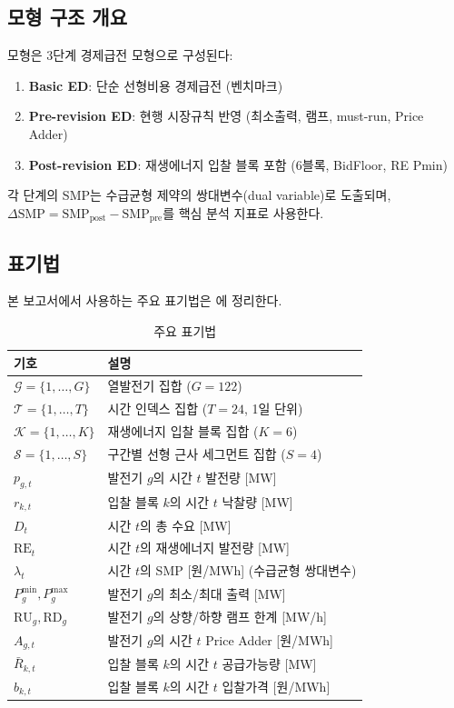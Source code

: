 \documentclass[11pt, a4paper]{article}
\begin{document}
\subsection{모형 구조 개요}

모형은 3단계 경제급전 모형으로 구성된다:
\begin{enumerate}[noitemsep]
    \item \textbf{Basic ED}: 단순 선형비용 경제급전 (벤치마크)
    \item \textbf{Pre-revision ED}: 현행 시장규칙 반영 (최소출력, 램프, must-run, Price Adder)
    \item \textbf{Post-revision ED}: 재생에너지 입찰 블록 포함 (6블록, BidFloor, RE Pmin)
\end{enumerate}
각 단계의 SMP는 수급균형 제약의 쌍대변수(dual variable)로 도출되며,
$\Delta\text{SMP} = \text{SMP}_{\text{post}} - \text{SMP}_{\text{pre}}$를 핵심 분석 지표로 사용한다.

\subsection{표기법}

본 보고서에서 사용하는 주요 표기법은 에 정리한다.

\begin{table}[H]
\centering
\caption{주요 표기법}\label{tab:notation}
\small
\begin{tabularx}{\textwidth}{>{\raggedright}p{3cm} X}
\toprule
\textbf{기호} & \textbf{설명} \\
\midrule
$\mathcal{G} = \{1, \ldots, G\}$ & 열발전기 집합 ($G=122$) \\
$\mathcal{T} = \{1, \ldots, T\}$ & 시간 인덱스 집합 ($T=24$, 1일 단위) \\
$\mathcal{K} = \{1, \ldots, K\}$ & 재생에너지 입찰 블록 집합 ($K=6$) \\
$\mathcal{S} = \{1, \ldots, S\}$ & 구간별 선형 근사 세그먼트 집합 ($S=4$) \\
$p_{g,t}$ & 발전기 $g$의 시간 $t$ 발전량 [MW] \\
$r_{k,t}$ & 입찰 블록 $k$의 시간 $t$ 낙찰량 [MW] \\
$D_t$ & 시간 $t$의 총 수요 [MW] \\
$\text{RE}_t$ & 시간 $t$의 재생에너지 발전량 [MW] \\
$\lambda_t$ & 시간 $t$의 SMP [원/MWh] (수급균형 쌍대변수) \\
$P_g^{\min}, P_g^{\max}$ & 발전기 $g$의 최소/최대 출력 [MW] \\
$\text{RU}_g, \text{RD}_g$ & 발전기 $g$의 상향/하향 램프 한계 [MW/h] \\
$A_{g,t}$ & 발전기 $g$의 시간 $t$ Price Adder [원/MWh] \\
$\bar{R}_{k,t}$ & 입찰 블록 $k$의 시간 $t$ 공급가능량 [MW] \\
$b_{k,t}$ & 입찰 블록 $k$의 시간 $t$ 입찰가격 [원/MWh] \\
\bottomrule
\end{tabularx}
\end{table}
\end{document}
